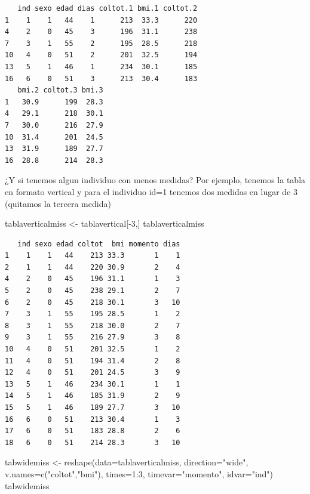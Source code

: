 \documentclass[
]{book}
\newenvironment{Shaded}{\begin{snugshade}}{\end{snugshade}}
\newcommand{\AttributeTok}[1]{\textcolor[rgb]{0.77,0.63,0.00}{#1}}
\newcommand{\DecValTok}[1]{\textcolor[rgb]{0.00,0.00,0.81}{#1}}
\newcommand{\FunctionTok}[1]{\textcolor[rgb]{0.00,0.00,0.00}{#1}}
\newcommand{\NormalTok}[1]{#1}
\newcommand{\OtherTok}[1]{\textcolor[rgb]{0.56,0.35,0.01}{#1}}
\newcommand{\SpecialCharTok}[1]{\textcolor[rgb]{0.00,0.00,0.00}{#1}}
\newcommand{\StringTok}[1]{\textcolor[rgb]{0.31,0.60,0.02}{#1}}
\begin{document}
\begin{verbatim}
   ind sexo edad dias coltot.1 bmi.1 coltot.2
1    1    1   44    1      213  33.3      220
4    2    0   45    3      196  31.1      238
7    3    1   55    2      195  28.5      218
10   4    0   51    2      201  32.5      194
13   5    1   46    1      234  30.1      185
16   6    0   51    3      213  30.4      183
   bmi.2 coltot.3 bmi.3
1   30.9      199  28.3
4   29.1      218  30.1
7   30.0      216  27.9
10  31.4      201  24.5
13  31.9      189  27.7
16  28.8      214  28.3
\end{verbatim}

¿Y si tenemos algun individuo con menos medidas? Por ejemplo, tenemos la tabla en formato vertical y para el individuo id=1 tenemos dos medidas en lugar de 3 (quitamos la tercera medida)

\begin{Shaded}
\begin{Highlighting}[]
\NormalTok{tablaverticalmiss }\OtherTok{\textless{}{-}}\NormalTok{ tablavertical[}\SpecialCharTok{{-}}\DecValTok{3}\NormalTok{,]}
\NormalTok{tablaverticalmiss}
\end{Highlighting}
\end{Shaded}

\begin{verbatim}
   ind sexo edad coltot  bmi momento dias
1    1    1   44    213 33.3       1    1
2    1    1   44    220 30.9       2    4
4    2    0   45    196 31.1       1    3
5    2    0   45    238 29.1       2    7
6    2    0   45    218 30.1       3   10
7    3    1   55    195 28.5       1    2
8    3    1   55    218 30.0       2    7
9    3    1   55    216 27.9       3    8
10   4    0   51    201 32.5       1    2
11   4    0   51    194 31.4       2    8
12   4    0   51    201 24.5       3    9
13   5    1   46    234 30.1       1    1
14   5    1   46    185 31.9       2    9
15   5    1   46    189 27.7       3   10
16   6    0   51    213 30.4       1    3
17   6    0   51    183 28.8       2    6
18   6    0   51    214 28.3       3   10
\end{verbatim}

\begin{Shaded}
\begin{Highlighting}[]
\NormalTok{tabwidemiss }\OtherTok{\textless{}{-}} \FunctionTok{reshape}\NormalTok{(}\AttributeTok{data=}\NormalTok{tablaverticalmiss, }
                       \AttributeTok{direction=}\StringTok{"wide"}\NormalTok{, }
                       \AttributeTok{v.names=}\FunctionTok{c}\NormalTok{(}\StringTok{"coltot"}\NormalTok{,}\StringTok{"bmi"}\NormalTok{), }
                       \AttributeTok{times=}\DecValTok{1}\SpecialCharTok{:}\DecValTok{3}\NormalTok{, }
                       \AttributeTok{timevar=}\StringTok{"momento"}\NormalTok{, }
                       \AttributeTok{idvar=}\StringTok{"ind"}\NormalTok{)}
\NormalTok{tabwidemiss}
\end{Highlighting}
\end{Shaded}
\end{document}
